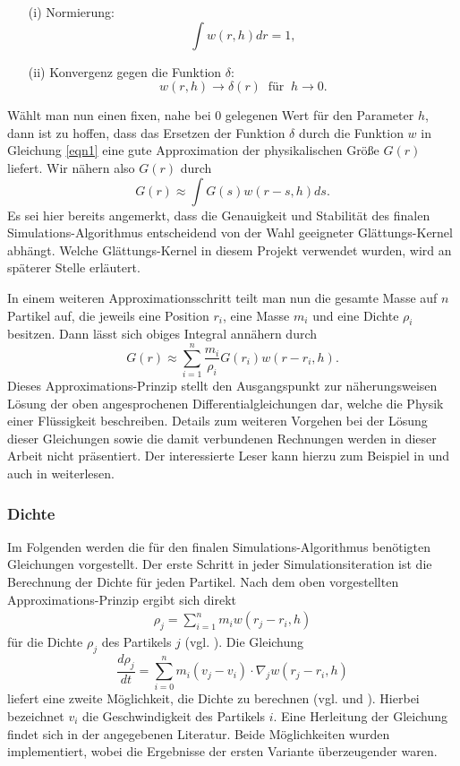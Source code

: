 \begin{enumerate}
\item[(i)] Normierung:
\[
\int w(r,h) dr = 1,
\]
\item[(ii)] Konvergenz gegen die Funktion $\delta$:
\[
w(r,h) \to \delta(r) \ \text{ für } \ h \to 0.
\]
\end{enumerate}
Wählt man nun einen fixen, nahe bei $0$ gelegenen Wert für den Parameter $h$, dann ist zu hoffen, dass das Ersetzen der Funktion $\delta$ durch die Funktion $w$ in Gleichung \ref{eqn1} eine gute Approximation der physikalischen Größe $G(r)$ liefert. Wir nähern also $G(r)$ durch
\[
G(r) \approx \int G(s)w(r - s, h) ds.
\]
Es sei hier bereits angemerkt, dass die Genauigkeit und Stabilität des finalen Simulations-Algorithmus entscheidend von der Wahl geeigneter Glättungs-Kernel abhängt. Welche Glättungs-Kernel in diesem Projekt verwendet wurden, wird an späterer Stelle erläutert.
\medskip

\noindent In einem weiteren Approximationsschritt teilt man nun die gesamte Masse auf $n$ Partikel auf, die jeweils eine Position $r_i$, eine Masse $m_i$ und eine Dichte $\rho_i$ besitzen. Dann lässt sich obiges Integral annähern durch
\[
G(r) \approx \sum_{i=1}^n\frac{m_i}{\rho_i} G(r_i)w(r - r_i, h).
\]
Dieses Approximations-Prinzip stellt den Ausgangspunkt zur näherungsweisen Lösung der oben angesprochenen Differentialgleichungen dar, welche die Physik einer Flüssigkeit beschreiben. Details zum weiteren Vorgehen bei der Lösung dieser Gleichungen sowie die damit verbundenen Rechnungen werden in dieser Arbeit nicht präsentiert. Der interessierte Leser kann hierzu zum Beispiel in \cite{IntroSPH} und auch in \cite{FlowSPH} weiterlesen.
\medskip

\subsubsection*{Dichte}
Im Folgenden werden die für den finalen Simulations-Algorithmus benötigten Gleichungen vorgestellt. Der erste Schritt in jeder Simulationsiteration ist die Berechnung der Dichte für jeden Partikel. Nach dem oben vorgestellten Approximations-Prinzip ergibt sich direkt
\begin{align}\label{density}
\rho_j = \sum_{i=1}^n m_i w(r_j - r_i, h)
\end{align}
für die Dichte $\rho_j$ des Partikels $j$ (vgl. \cite[S. 90]{IntroSPH}). Die Gleichung
\[
\frac{d\rho_j}{dt} = \sum_{i = 0}^n m_i (v_j-v_i) \cdot \nabla_j w(r_j - r_i, h)
\]
liefert eine zweite Möglichkeit, die Dichte zu berechnen (vgl. \cite[S. 91]{IntroSPH} und \cite[S. 400]{FlowSPH}). Hierbei bezeichnet $v_i$ die Geschwindigkeit des Partikels $i$. Eine Herleitung der Gleichung findet sich in der angegebenen Literatur. Beide Möglichkeiten wurden implementiert, wobei die Ergebnisse der ersten Variante überzeugender waren.
\medskip

